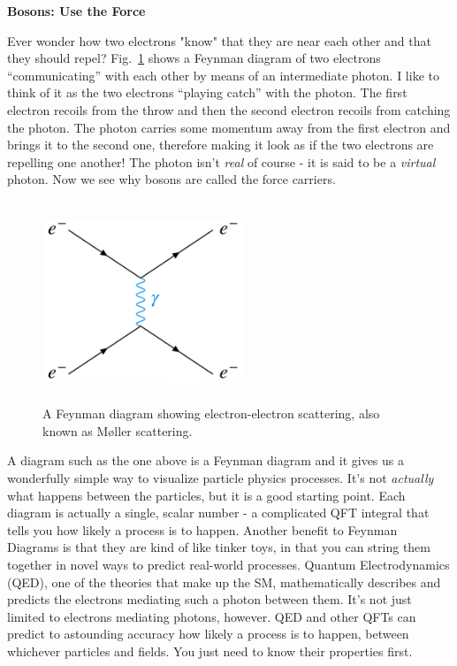 \textbf{Bosons: Use the Force}

Ever wonder how two electrons "know" that they are near each other and that they should repel? 
Fig.~\ref{fig:ee_scattering} shows a Feynman diagram of two electrons ``communicating'' with each other by means of an intermediate photon.
I like to think of it as the two electrons ``playing catch'' with the photon.
The first electron recoils from the throw and then the second electron recoils from catching the photon.
The photon carries some momentum away from the first electron and brings it to the second one, therefore making it look as if the two electrons are repelling one another!
The photon isn't \emph{real} of course - it is said to be a \emph{virtual} photon.
Now we see why bosons are called the force carriers.
\begin{figure}[pbth]
\centering
\includegraphics[width=6cm,height=6cm,keepaspectratio]{figures/sm/ee_scattering_moeller.png}
    \caption{A Feynman diagram showing electron-electron scattering, also known as Møller scattering.} 
    \label{fig:ee_scattering}
\end{figure}

A diagram such as the one above is a Feynman diagram and it gives us a wonderfully simple way to visualize particle physics processes.
It's not \emph{actually} what happens between the particles, but it is a good starting point.
Each diagram is actually a single, scalar number -
a complicated QFT integral that tells you how likely a process is to happen.
Another benefit to Feynman Diagrams is that they are kind of like tinker toys, 
in that you can string them together in novel ways to predict real-world processes.
Quantum Electrodynamics (QED), one of the theories that make up the SM, mathematically describes and predicts the electrons mediating such a photon between them. 
It's not just limited to electrons mediating photons, however.
QED and other QFTs can predict to astounding accuracy how likely a process is to happen, between whichever particles and fields. 
You just need to know their properties first.

